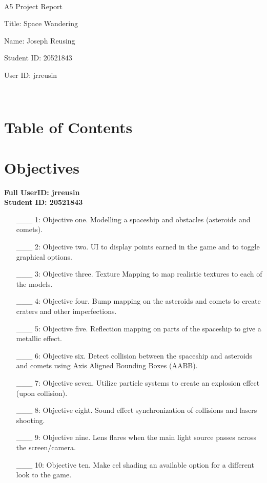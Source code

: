\documentclass {article}
\begin{document}
~\vfill
\begin{center}
\Large

A5 Project Report

Title: Space Wandering

Name: Joseph Reusing

Student ID: 20521843

User ID: jrreusin
\end{center}
\vfill ~\vfill~


\newpage
\section{Table of Contents}
\tableofcontents



\newpage
\section{Objectives}
\textbf{Full UserID: jrreusin\\Student ID: 20521843}
\begin{enumerate}
     \item[\_\_\_ 1:]  Objective one. Modelling a spaceship and obstacles (asteroids and comets).

     \item[\_\_\_ 2:]  Objective two. UI to display points earned in the game and to toggle graphical options.

     \item[\_\_\_ 3:]  Objective three. Texture Mapping to map realistic textures to each of the models.

     \item[\_\_\_ 4:]  Objective four. Bump mapping on the asteroids and comets to create craters and other imperfections.

     \item[\_\_\_ 5:]  Objective five. Reflection mapping on parts of the spaceship to give a metallic effect.

     \item[\_\_\_ 6:]  Objective six. Detect collision between the spaceship and asteroids and comets using Axis Aligned Bounding Boxes (AABB).     
     
     \item[\_\_\_ 7:]  Objective seven. Utilize particle systems to create an explosion effect (upon collision).

     \item[\_\_\_ 8:]  Objective eight. Sound effect synchronization of collisions and lasers shooting.
     
     \item[\_\_\_ 9:]  Objective nine. Lens flares when the main light source passes across the screen/camera.

     \item[\_\_\_ 10:] Objective ten. Make cel shading an available option for a different look to the game.
     
\end{enumerate}
\end{document}

